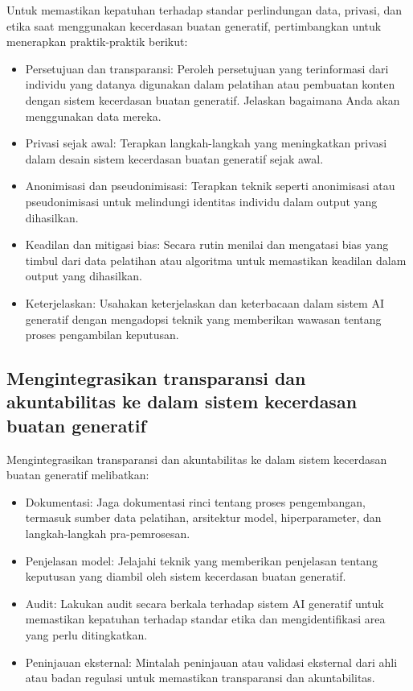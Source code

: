 \documentclass{article}
\begin{document}
Untuk memastikan kepatuhan terhadap standar perlindungan data, privasi, dan etika saat menggunakan kecerdasan buatan generatif, pertimbangkan untuk menerapkan praktik-praktik berikut:
\begin{itemize}
    \item Persetujuan dan transparansi: Peroleh persetujuan yang terinformasi dari individu yang datanya digunakan dalam pelatihan atau pembuatan konten dengan sistem kecerdasan buatan generatif. Jelaskan bagaimana Anda akan menggunakan data mereka.
    \item Privasi sejak awal: Terapkan langkah-langkah yang meningkatkan privasi dalam desain sistem kecerdasan buatan generatif sejak awal.
    \item Anonimisasi dan pseudonimisasi: Terapkan teknik seperti anonimisasi atau pseudonimisasi untuk melindungi identitas individu dalam output yang dihasilkan.
    \item Keadilan dan mitigasi bias: Secara rutin menilai dan mengatasi bias yang timbul dari data pelatihan atau algoritma untuk memastikan keadilan dalam output yang dihasilkan.
    \item Keterjelaskan: Usahakan keterjelaskan dan keterbacaan dalam sistem AI generatif dengan mengadopsi teknik yang memberikan wawasan tentang proses pengambilan keputusan.
\end{itemize}

\subsection{Mengintegrasikan transparansi dan akuntabilitas ke dalam sistem kecerdasan buatan generatif}
Mengintegrasikan transparansi dan akuntabilitas ke dalam sistem kecerdasan buatan generatif melibatkan:
\begin{itemize}
    \item Dokumentasi: Jaga dokumentasi rinci tentang proses pengembangan, termasuk sumber data pelatihan, arsitektur model, hiperparameter, dan langkah-langkah pra-pemrosesan.
    \item Penjelasan model: Jelajahi teknik yang memberikan penjelasan tentang keputusan yang diambil oleh sistem kecerdasan buatan generatif.
    \item Audit: Lakukan audit secara berkala terhadap sistem AI generatif untuk memastikan kepatuhan terhadap standar etika dan mengidentifikasi area yang perlu ditingkatkan.
    \item Peninjauan eksternal: Mintalah peninjauan atau validasi eksternal dari ahli atau badan regulasi untuk memastikan transparansi dan akuntabilitas.
\end{itemize}
\end{document}
